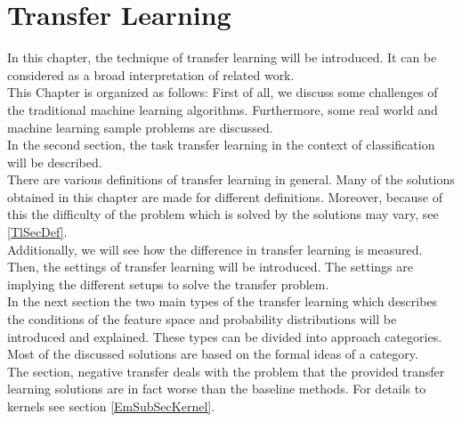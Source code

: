 \chapter{Transfer Learning}\label{Tl}
In this chapter, the technique of transfer learning will be introduced.
It can be considered as a broad interpretation of related work.\\
This Chapter is organized as follows:    
First of all, we discuss some challenges of the traditional machine learning algorithms.
Furthermore, some real world and machine learning sample problems are discussed.\\
In the second section, the task transfer learning in the context of classification will be described.\\
There are various definitions of transfer learning in general.
Many of the solutions obtained in this chapter are made for different definitions.
Moreover, because of this the difficulty of the problem which is solved by the solutions may vary, see \ref{TlSecDef}.\\
Additionally, we will see how the difference in transfer learning is measured.\\
Then, the settings of transfer learning will be introduced.
The settings are implying the different setups to solve the transfer problem.\\
In the next section the two main types of the transfer learning which describes the conditions of the feature space and probability distributions will be introduced and explained.
These types can be divided into approach categories.
Most of the discussed solutions are based on the formal ideas of a category.\\
The section, negative transfer deals with the problem that the provided transfer learning solutions are in fact worse than the baseline methods.
For details to kernels see section \ref{EmSubSecKernel}.


